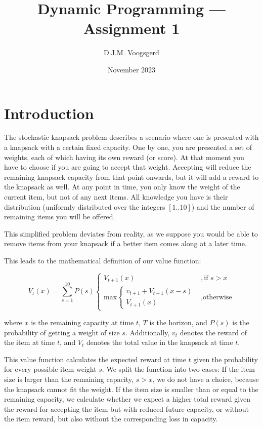 \documentclass[nonacm,sigconf]{acmart}
\title{Dynamic Programming --- Assignment 1}
\author{D.J.M. Voogsgerd}
\date{November 2023}
\begin{document}
\maketitle

\section{Introduction}

The stochastic knapsack problem describes a scenario where one is presented with
a knapsack with a certain fixed capacity. One by one,
you are presented a set of weights, each of which having its own reward (or
score). At that moment you have to choose if you are going to accept that
weight. Accepting will reduce the remaining knapsack capacity from that point
onwards, but it will add a reward to the knapsack as well. At any point in time,
you only know the weight of the current item, but not of any next items. All
knowledge you have is their distribution (uniformly distributed over the
integers $[1..10]$) and the number of remaining items you will be offered.

This simplified problem deviates from reality, as we suppose you would be able
to remove items from your knapsack if a better item comes along at a later time.

This leads to the mathematical definition of our value function:

\begin{equation}\label{eq:value_function}
    V_t(x) = \sum_{s=1}^{10} P(s) \begin{cases}
        V_{t+1}(x) &, \text{if } s > x \\
        \text{max}\begin{cases}
            v_{t+1}+V_{t+1}(x-s) \\
            V_{t+1}(x)
        \end{cases}
        &, \text{otherwise}
    \end{cases}
\end{equation}

where $x$ is the remaining capacity at time $t$, $T$ is the horizon, and $P(s)$
is the probability of getting a weight of size $s$. Additionally, $v_t$ denotes
the reward of the item at time $t$, and $V_t$ denotes the total value in the
knapsack at time $t$.

This value function calculates the expected reward at time $t$ given the
probability for every possible item weight $s$. We split the function into two
cases: If the item size is larger than the remaining capacity, $s > x$, we do
not have a choice, because the knapsack cannot fit the weight. If the item size
is smaller than or equal to the remaining capacity, we calculate whether we
expect a higher total reward given the reward for accepting the item but with
reduced future capacity, or without the item reward, but also without the
corresponding loss in capacity.
\end{document}
